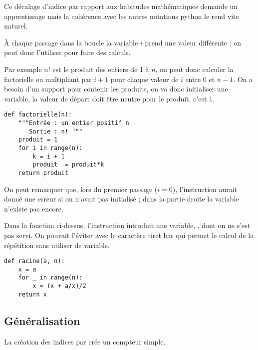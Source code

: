 Ce décalage d'indice par rapport aux habitudes mathématiques demande un apprentissage mais la cohérence avec les autres notations python le rend vite naturel.

\medskip

À chaque passage dans la boucle la variable $i$ prend une valeur différente : on peut donc l'utiliser pour faire des calculs. 

Par exemple $n!$ est le produit des entiers de 1 à $n$, on peut donc calculer la factorielle en multipliant par $i+1$ pour chaque valeur de $i$ entre 0 et $n-1$. On a besoin d'un support pour contenir les produits, on va donc initialiser une variable, la valeur de départ doit être neutre pour le produit, c'est 1.
\begin{lstlisting}
def factorielle(n):
    """Entrée : un entier positif n
       Sortie : n! """
    produit = 1
    for i in range(n):
        k = i + 1
        produit  = produit*k
    return produit 
\end{lstlisting}
On peut remarquer que, lors du premier passage ($i=0$), l'instruction  aurait donné une erreur si on n'avait pas initialisé  ; dans la partie droite la variable  n'existe pas encore.

\medskip

Dans la fonction  ci-dessus, l'instruction  introduit une variable, , dont on ne s'est pas servi. On pouvait l'éviter avec le caractère tiret bas qui permet le calcul de la répétition sans utiliser de variable.
\begin{lstlisting}
def racine(a, n):
    x = a
    for _ in range(n):
        x = (x + a/x)/2
    return x
\end{lstlisting}
\subsection{Généralisation}
La création des indices par  crée un compteur simple.

